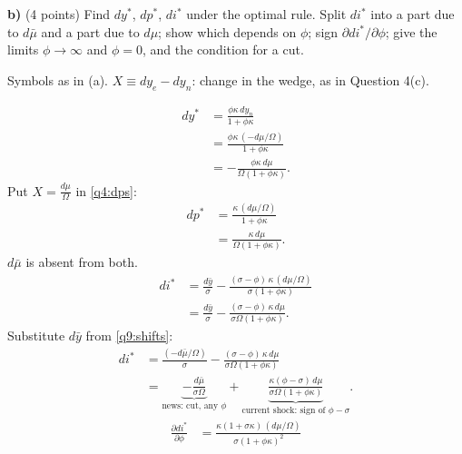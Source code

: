 \textbf{b)} (4 points) Find $dy^*$, $dp^*$, $di^*$ under the optimal rule. Split $di^*$ into a part due to $d\bar\mu$ and a part due to $d\mu$; show
which depends on $\phi$; sign $\partial di^*/\partial\phi$; give the limits $\phi\to\infty$ and $\phi=0$, and the condition for a cut.
\resolespaco
\begin{sol}
\begin{notacao}
\item Symbols as in (a). $X\equiv dy_e-dy_n$: change in the wedge, as in Question 4(c).
\end{notacao}
\begin{align}
dy^*&=\frac{\phi\kappa\,dy_n}{1+\phi\kappa}\nonumber\\
&=\frac{\phi\kappa\,(-d\mu/\Omega)}{1+\phi\kappa}\nonumber\\
&=-\frac{\phi\kappa\,d\mu}{\Omega(1+\phi\kappa)} . \label{q9:dys}
\end{align}
Put $X=\frac{d\mu}{\Omega}$ in \eqref{q4:dps}:
\begin{align}
dp^*&=\frac{\kappa\,(d\mu/\Omega)}{1+\phi\kappa}\nonumber\\
&=\frac{\kappa\,d\mu}{\Omega(1+\phi\kappa)} . \label{q9:dps}
\end{align}
$d\bar\mu$ is absent from both.
\begin{align}
di^*&=\frac{d\bar y}{\sigma}-\frac{(\sigma-\phi)\,\kappa\,(d\mu/\Omega)}{\sigma(1+\phi\kappa)}\nonumber\\
&=\frac{d\bar y}{\sigma}-\frac{(\sigma-\phi)\,\kappa\,d\mu}{\sigma\Omega(1+\phi\kappa)} . \nonumber
\end{align}
Substitute $d\bar y$ from \eqref{q9:shifts}:
\begin{align}
di^*&=\frac{(-d\bar\mu/\Omega)}{\sigma}-\frac{(\sigma-\phi)\,\kappa\,d\mu}{\sigma\Omega(1+\phi\kappa)}\nonumber\\
&=\underbrace{-\frac{d\bar\mu}{\sigma\Omega}}_{\text{news: cut, any }\phi}+\underbrace{\frac{\kappa(\phi-\sigma)\,d\mu}{\sigma\Omega(1+\phi\kappa)}}_{\text{current shock: sign of }\phi-\sigma}. \label{q9:di}
\end{align}
\begin{align}
\frac{\partial di^*}{\partial\phi}&=\frac{\kappa(1+\sigma\kappa)\,(d\mu/\Omega)}{\sigma(1+\phi\kappa)^2}\nonumber\\

\end{align}
\end{sol}
